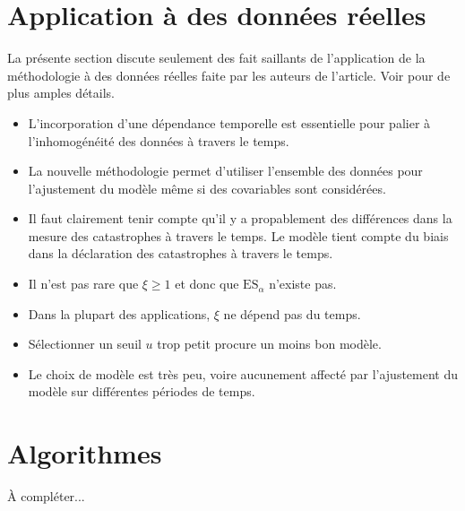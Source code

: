 \section{Application à des données réelles}
La présente section discute seulement des fait saillants de l'application de la méthodologie à des données réelles faite par les auteurs de l'article. Voir \cite{chavez2016extreme} pour de plus amples détails.
\begin{itemize}
\item L'incorporation d'une dépendance temporelle est essentielle pour palier à l'inhomogénéité des données à travers le temps.
\item La nouvelle méthodologie permet d'utiliser l'ensemble des données pour l'ajustement du modèle même si des covariables sont considérées.
\item Il faut clairement tenir compte qu'il y a propablement des différences dans la mesure des catastrophes à travers le temps. Le modèle tient compte du biais dans la déclaration des catastrophes à travers le temps.
\item Il n'est pas rare que $\xi \ge 1$ et donc que $\text{ES}_\alpha$ n'existe pas.
\item Dans la plupart des applications, $\xi$ ne dépend pas du temps.
\item Sélectionner un seuil $u$ trop petit procure un moins bon modèle.
\item Le choix de modèle est très peu, voire aucunement affecté par l'ajustement du modèle sur différentes périodes de temps.
\end{itemize}



\section{Algorithmes}
\label{sec:algos}
À compléter...